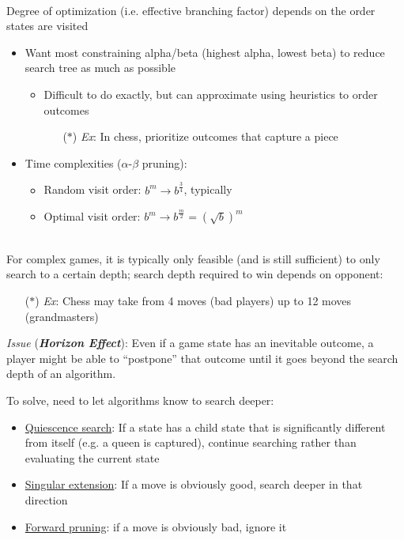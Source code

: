 \documentclass[12pt]{extarticle}
\theoremstyle{definition}
\theoremstyle{remark}
\newcommand{\pstart}[0]{\noindent}
\newcommand{\newp}[0]{~\\ \pstart}
\newcommand{\term}[1]{\noindent\textbf{\textit{#1}}}
\begin{document}
\newp
Degree of optimization (i.e. effective branching factor) depends on the order states are visited \begin{itemize}
    \item Want most constraining alpha/beta (highest alpha, lowest beta) to reduce search tree as much as possible \begin{itemize}
        \item Difficult to do exactly, but can approximate using heuristics to order outcomes \begin{itemize}
            \item[($\ast$)] \textit{Ex}: In chess, prioritize outcomes that capture a piece
        \end{itemize}
    \end{itemize}
    \item Time complexities ($\alpha$-$\beta$ pruning): \begin{itemize}
        \item Random visit order: $b^m\to b^{\frac{3}{4}}$, typically
        \item Optimal visit order: $b^m\to b^{\frac{m}{2}}=\left(\sqrt{b}\right)^m$
    \end{itemize}
\end{itemize}

\newp
For complex games, it is typically only feasible (and is still sufficient) to only search to a certain depth; search depth required to win depends on opponent:\begin{itemize}
    \item[($\ast$)] \textit{Ex}: Chess may take from 4 moves (bad players) up to 12 moves (grandmasters)
\end{itemize}

\pstart
\textit{Issue} (\term{Horizon Effect}): Even if a game state has an inevitable outcome, a player might be able to ``postpone'' that outcome until it goes beyond the search depth of an algorithm.

\vspace{4pt}\pstart
To solve, need to let algorithms know to search deeper:\begin{itemize}
    \item \ul{Quiescence search}: If a state has a child state that is significantly different from itself (e.g. a queen is captured), continue searching rather than evaluating the current state
    \item \ul{Singular extension}: If a move is obviously good, search deeper in that direction
    \item \ul{Forward pruning}: if a move is obviously bad, ignore it
\end{itemize}
\end{document}
